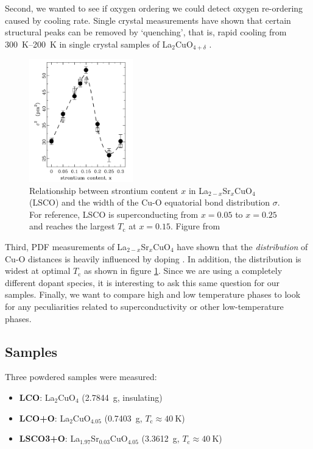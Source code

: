 Second, we wanted to see if oxygen ordering we could detect oxygen re-ordering caused by cooling rate. Single crystal measurements have shown that certain structural peaks can be removed by `quenching', that is, rapid cooling from \SIrange{300}{200}{\kelvin} in single crystal samples of La$_2$CuO$_{4+\delta}$ \cite{Lee2004, Poccia2012}.

\begin{figure}
    \centering
    \includegraphics[width=0.4\textwidth]{fig/pdf/bozin_cuo.png}
    \caption{Relationship between strontium content $x$ in La$_{2-x}$Sr$_x$CuO$_4$ (LSCO) and the width of the Cu-O equatorial bond distribution $\sigma$. For reference, LSCO is superconducting from $x=0.05$ to $x=0.25$ and reaches the largest $T_\text{c}$ at $x=0.15$. Figure from \cite{Bozin2000}}
    \label{fig:bozin_cuo}
\end{figure}

Third, PDF measurements of La$_{2-x}$Sr$_x$CuO$_4$ have shown that the \emph{distribution} of Cu-O distances is heavily influenced by doping \cite{Bozin2000}. In addition, the distribution is widest at optimal $T_\text{c}$ as shown in figure \ref{fig:bozin_cuo}. Since we are using a completely different dopant species, it is interesting to ask this same question for our samples. Finally, we want to compare high and low temperature phases to look for any peculiarities related to superconductivity or other low-temperature phases.

\subsection{Samples}
Three powdered samples were measured:

\begin{itemize}
    \item \textbf{LCO}: La$_2$CuO$_4$ (\SI{2.7844}{\gram}, insulating)
    \item \textbf{LCO+O}: La$_2$CuO$_{4.05}$ (\SI{0.7403}{\gram}, $T_\text{c} \approx \SI{40}{\kelvin}$)
    \item \textbf{LSCO3+O}: La$_{1.97}$Sr$_{0.03}$CuO$_{4.05}$ (\SI{3.3612}{\gram}, $T_\text{c} \approx \SI{40}{\kelvin}$)
\end{itemize}

